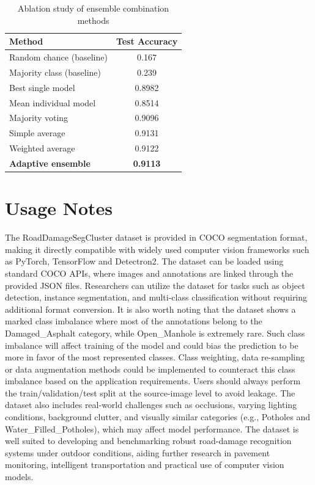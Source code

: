\documentclass{article}
\begin{document}
\begin{table}[ht]
\centering
\caption{Ablation study of ensemble combination methods}
\label{tab:ablation}
\setlength{\tabcolsep}{6pt}
\renewcommand{\arraystretch}{1.15}
\begin{tabular}{lc}
\toprule
\textbf{Method} & \textbf{Test Accuracy} \\
\toprule
Random chance (baseline)    & 0.167 \\
Majority class (baseline)   & 0.239 \\
Best single model           & 0.8982 \\
Mean individual model       & 0.8514 \\
Majority voting             & 0.9096 \\
Simple average              & 0.9131 \\
Weighted average            & 0.9122 \\
\textbf{Adaptive ensemble}  & \textbf{0.9113} \\
\bottomrule
\end{tabular}
\end{table}

\section*{Usage Notes}
The RoadDamageSegCluster dataset is provided in COCO segmentation format, making it directly compatible with widely used computer vision frameworks such as PyTorch, TensorFlow and Detectron2. The dataset can be loaded using standard COCO APIs, where images and annotations are linked through the provided JSON files. Researchers can utilize the dataset for tasks such as object detection, instance segmentation, and multi-class classification without requiring additional format conversion. It is also worth noting that the dataset shows a marked class imbalance where most of the annotations belong to the Damaged\_Asphalt category, while Open\_Manhole is extremely rare. Such class imbalance will affect training of the model and could bias the prediction to be more in favor of the most represented classes. Class weighting, data re-sampling or data augmentation methods could be implemented to counteract this class imbalance based on the application requirements. Users should always perform the train/validation/test split at the source-image level to avoid leakage. The dataset also includes real-world challenges such as occlusions, varying lighting conditions, background clutter, and visually similar categories (e.g., Potholes and Water\_Filled\_Potholes), which may affect model performance. The dataset is well suited to developing and benchmarking robust road-damage recognition systems under outdoor conditions, aiding further research in pavement monitoring, intelligent transportation and practical use of computer vision models. 
\end{document}
